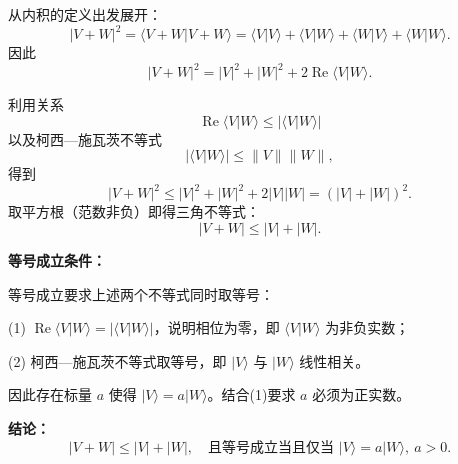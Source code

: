 \begin{solution}

\answer
从内积的定义出发展开：
\[
|V+W|^2=\langle V+W|V+W\rangle
=\langle V|V\rangle+\langle V|W\rangle+\langle W|V\rangle+\langle W|W\rangle.
\]
因此
\[
|V+W|^2=|V|^2+|W|^2+2\operatorname{Re}\langle V|W\rangle.
\]

利用关系
\[
\operatorname{Re}\langle V|W\rangle \le |\langle V|W\rangle|
\]
以及柯西—施瓦茨不等式
\[
|\langle V|W\rangle|\le \|V\|\|W\|,
\]
得到
\[
|V+W|^2 \le |V|^2+|W|^2+2|V||W|=(|V|+|W|)^2.
\]
取平方根（范数非负）即得三角不等式：
\[
|V+W|\le |V|+|W|.
\]

\textbf{等号成立条件：}

等号成立要求上述两个不等式同时取等号：

(1) $\operatorname{Re}\langle V|W\rangle = |\langle V|W\rangle|$，说明相位为零，即 $\langle V|W\rangle$ 为非负实数；

(2) 柯西—施瓦茨不等式取等号，即 $|V\rangle$ 与 $|W\rangle$ 线性相关。

因此存在标量 $a$ 使得 $|V\rangle=a|W\rangle$。结合(1)要求 $a$ 必须为正实数。

\textbf{结论：}
\[
|V+W|\le |V|+|W|,
\quad \text{且等号成立当且仅当 } |V\rangle=a|W\rangle,\ a>0.
\]
\end{solution}